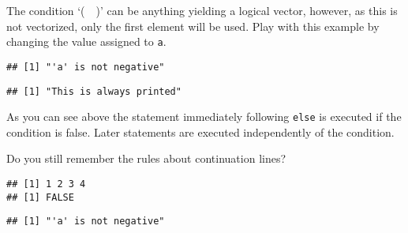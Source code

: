 \documentclass[paper=a4,headsepline,BCOR=12mm,twoside,open=right,%
titlepage,headings=small,fontsize=10pt,index=totoc,bibliography=totoc,%
captions=tableheading,captions=nooneline]{scrbook}\usepackage{knitr}
\begin{document}
The condition `(\ \ )' can be anything yielding a logical vector, however, as this is not vectorized, only the first element will be used. Play with this example by changing the value assigned to \texttt{a}.

\begin{knitrout}\footnotesize
{}\color{fgcolor}\begin{kframe}
\begin{alltt}
 \hlkwb{<-} 
  \hlopt{<} \hlstd{)} \hlstd{(}\hlstd{)}  \hlstd{(}\hlstd{)}
\end{alltt}
\begin{verbatim}
## [1] "'a' is not negative"
\end{verbatim}
\begin{alltt}
\hlstd{(}\hlstd{)}
\end{alltt}
\begin{verbatim}
## [1] "This is always printed"
\end{verbatim}
\end{kframe}
\end{knitrout}

As you can see above the statement immediately following \texttt{else} is executed if the condition is false. Later statements are executed independently of the condition.

Do you still remember the rules about continuation lines?

\begin{knitrout}\footnotesize
{}\color{fgcolor}\begin{kframe}
\begin{verbatim}
## [1] 1 2 3 4
## [1] FALSE
\end{verbatim}
\end{kframe}
\end{knitrout}

\begin{knitrout}\footnotesize
{}\color{fgcolor}\begin{kframe}
\begin{alltt}
 \hlkwb{<-} 
  \hlopt{<} \hlstd{)}
  \hlstd{(}\hlstd{)} 
    \hlstd{(}\hlstd{)}
\end{alltt}
\begin{verbatim}
## [1] "'a' is not negative"
\end{verbatim}
\end{kframe}
\end{knitrout}
\end{document}

